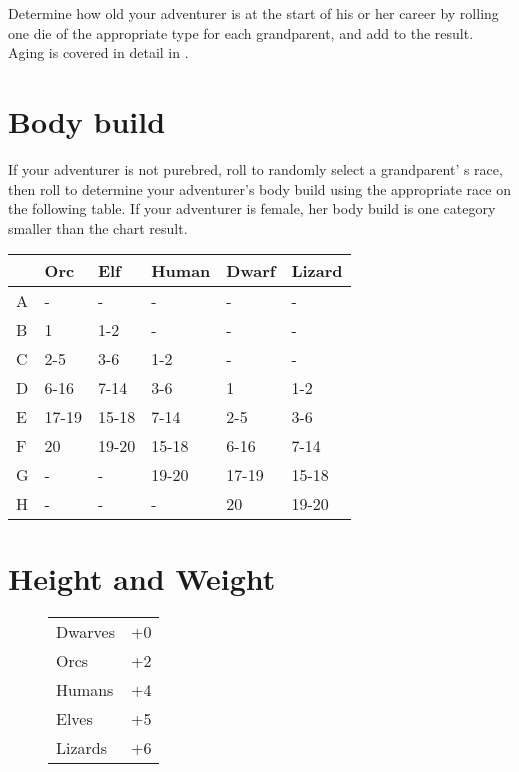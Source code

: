 \begin{multicols*}{2}
Determine how old your adventurer is at the start of his or her career by rolling one die of the appropriate type for each grandparent, and add  to the result. Aging is covered in detail in .


\section{Body build}
If your adventurer is not purebred, roll  to randomly select a grandparent' s race, then roll  to determine your adventurer's body build using the appropriate race on the following table. If your adventurer is female, her body build is one category smaller than the chart result.
\begin{normboxc}
\small
\begin{tabular}{@{} l l l l l l }
 & \textbf{Orc} & \textbf{Elf} & \textbf{Human} & \textbf{Dwarf} & \textbf{Lizard}\\
\midrule
A & - & - & - & - & -\\
B & 1 & 1-2 & - & - & -\\
C & 2-5 & 3-6 & 1-2 & - & -\\
D & 6-16 & 7-14 & 3-6 & 1 & 1-2\\
E & 17-19 & 15-18 & 7-14 & 2-5 & 3-6\\
F & 20 & 19-20 & 15-18 & 6-16 & 7-14\\
G & - & - & 19-20 & 17-19 & 15-18\\
H & - & - & - & 20 & 19-20
\end{tabular}
\end{normboxc}
\section{Height and Weight}
\begin{wrapfigure}[7]{l}[0pt]{60pt}
\begin{normbox}
\small
{}
\begin{tabular}{@{}l l}
Dwarves & +0\\
Orcs & +2\\
Humans & +4\\
Elves & +5\\
Lizards & +6\\
\end{tabular}
\end{normbox}
\end{wrapfigure}


\end{multicols*}
